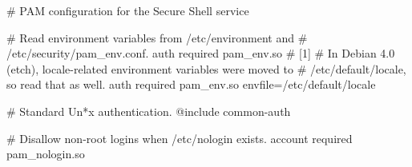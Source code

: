 \documentclass[mingoth,a4paper]{jsarticle}
\begin{document}
{{{{

\begin{commandline}
# PAM configuration for the Secure Shell service

# Read environment variables from /etc/environment and
# /etc/security/pam_env.conf.
auth       required     pam_env.so # [1]
# In Debian 4.0 (etch), locale-related environment variables were moved to
# /etc/default/locale, so read that as well.
auth       required     pam_env.so envfile=/etc/default/locale

# Standard Un*x authentication.
@include common-auth

# Disallow non-root logins when /etc/nologin exists.
account    required     pam_nologin.so


\end{commandline}}}}}
\end{document}
